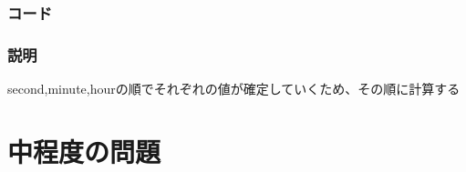 \documentclass[a4j,10pt,oneside,openany]{jsbook}
\begin{document}
\subsection*{コード}
\begin{framed}

\end{framed}

\subsection*{説明}
second,minute,hourの順でそれぞれの値が確定していくため、その順に計算する\\

\hrulefill

\chapter{中程度の問題}
\end{document}
